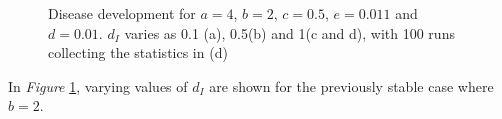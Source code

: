 \begin{figure}[H]
    \caption{Disease development for $a=4$, $b=2$, $c=0.5$, $e=0.011$ and $d=0.01$. $d_I$ varies as 0.1 (a), 0.5(b) and 1(c and d), with 100 runs collecting the statistics in (d)}
    \label{fig:vitalb2}
\end{figure}

In \textit{Figure} \ref{fig:vitalb2}, varying values of $d_I$ are shown for the previously stable case where $b=2$. 


